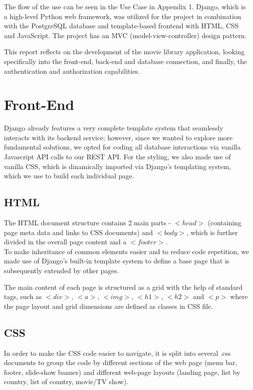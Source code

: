 \documentclass[letterpaper,twocolumn]{article}
\begin{document}
The flow of the use can be seen in the Use Case in Appendix 1. Django, which is a high-level Python web framework, was utilized for the project in combination with the PostgreSQL database and template-based frontend with HTML, CSS and JavaScript. The project has an MVC (model-view-controller) design pattern.

This report reflects on the development of the movie library application, looking specifically into the front-end, back-end and database connection, and finally, the authentication and authorization capabilities. 

\section{Front-End}

Django already features a very complete template system that seamlessly interacts with its backend service; however, since we wanted to explore more fundamental solutions, we opted for coding all database interactions via vanilla Javascript API calls to our REST API. For the styling, we also made use of vanilla CSS, which is dinamically imported via Django's templating system, which we use to build each individual page.

\subsection{HTML}

The HTML document structure contains 2 main parts - $<head>$ (containing page meta data and links to CSS documents) and $<body>$, which is further divided in the overall page content and a $<footer>$. \\

To make inheritance of common elements easier and to reduce code repetition, we made use of Django's built-in template system to define a base page that is subsequently extended by other pages.

The main content of each page is structured as a grid with the help of standard tags, such as $<div>$, $<a>$, $<img>$, $<h1>$, $<h2>$ and $<p>$ where the page layout and grid dimensions are defined as classes in CSS file.


\subsection{CSS}

In order to make the CSS code easier to navigate, it is split into several .css documents to group the code by different sections of the web page (menu bar, footer, slide-show banner) and different web-page layouts (landing page, list by country, list of country, movie/TV show).
\end{document}
